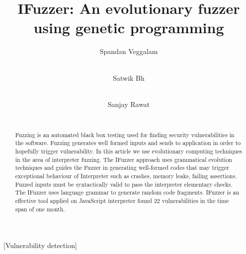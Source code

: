 \documentclass{sig-alternate}
\begin{document}
\title{IFuzzer: An evolutionary fuzzer using genetic programming}


\author{
\alignauthor
Spandan Veggalam\\
       \\
\and
\alignauthor
Satwik Bh\\
       \\
\and
\alignauthor
Sanjay Rawat\\
       \\
}

\maketitle

\begin{abstract}
Fuzzing is an automated black box testing used for finding security vulnerabilities in the software. Fuzzing generates well formed inputs and sends to application in order to hopefully trigger vulnerability. In this article we use evolutionary computing techniques in the area of interpreter fuzzing. The IFuzzer approach uses grammatical evolution techniques and guides the Fuzzer in generating well-formed codes that may trigger exceptional behaviour of Interpreter such as crashes, memory leaks, failing assertions. Fuzzed inputs must be syntactically valid to pass the interpreter elementary checks. The IFuzzer uses language grammar to generate random code fragments. IFuzzer is an effective tool applied on JavaScript interpreter found 22 vulnerabilities in the time span of one month.
\end{abstract}

[Vulnerability detection]
\end{document}

